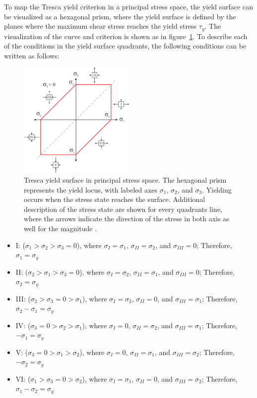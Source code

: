 \documentclass[12pt]{article}
\begin{document}
To map the Tresca yield criterion in a principal stress space, the yield surface can be visualized as a hexagonal prism,
where the yield surface is defined by the planes where the maximum shear stress reaches the yield stress $\tau_y$. The visualization of the curve and 
criterion is shown as in figure~\ref{fig:tresca_surface}. To describe each of the conditions in the yield surface quadrants, the following conditions can be written as follows:
\begin{figure}[H]
    \centering
    \includegraphics[width=0.5\textwidth]{images/TrescaSurface.png}
    \caption{Tresca yield surface in principal stress space. The hexagonal prism represents the yield locus, with labeled axes $\sigma_1$, $\sigma_2$, and $\sigma_3$. 
    Yielding occurs when the stress state reaches the surface. Additional description of the stress state
    are shown for every quadrants line, where the arrows indicate the direction of the stress in both axis as well
    for the magnitude \cite{hosford2005}.}
    \label{fig:tresca_surface}
\end{figure}

\begin{itemize}
    \item I: ($\sigma_1 > \sigma_2 > \sigma_3 = 0$), where $\sigma_{I} = \sigma_1$, $\sigma_{II} = \sigma_2$, and $\sigma_{III} = 0$; Therefore, $\sigma_1 = \sigma_y$
    \item II: ($\sigma_2 > \sigma_1 > \sigma_3 = 0$), where $\sigma_{I} = \sigma_2$, $\sigma_{II} = \sigma_1$, and $\sigma_{III} = 0$; Therefore, $\sigma_2 = \sigma_y$
    \item III: ($\sigma_2 > \sigma_3 = 0 > \sigma_1$), where $\sigma_{I} = \sigma_2$, $\sigma_{II} = 0$, and $\sigma_{III} = \sigma_1$; Therefore, $\sigma_2 - \sigma_1 = \sigma_y$
    \item IV: ($\sigma_3 = 0 > \sigma_2 > \sigma_1$), where $\sigma_{I} = 0$, $\sigma_{II} = \sigma_2$, and $\sigma_{III} = \sigma_1$; Therefore, $-\sigma_1 = \sigma_y$
    \item V: ($\sigma_3 = 0 > \sigma_1 > \sigma_2$), where $\sigma_{I} = 0$, $\sigma_{II} = \sigma_1$, and $\sigma_{III} = \sigma_2$; Therefore, $-\sigma_2 = \sigma_y$
    \item VI: ($\sigma_1 > \sigma_3 = 0 > \sigma_2$), where $\sigma_{I} = \sigma_1$, $\sigma_{II} = 0$, and $\sigma_{III} = \sigma_2$; Therefore, $\sigma_1 - \sigma_2 = \sigma_y$
\end{itemize}
\end{document}
